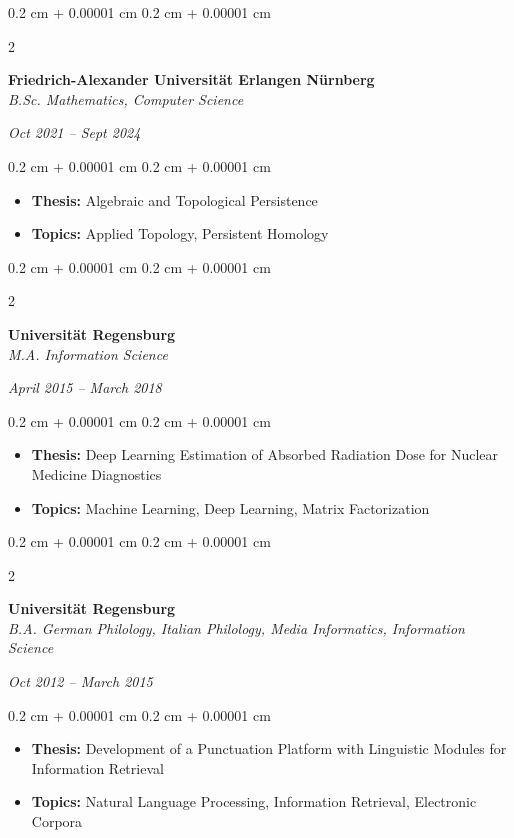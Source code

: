 \documentclass[10pt, letterpaper]{article}
\newenvironment{highlights}{
    \begin{itemize}[
        topsep=0.10 cm,
        parsep=0.10 cm,
        partopsep=0pt,
        itemsep=0pt,
        leftmargin=0.4 cm + 10pt
    ]
}{
    \end{itemize}
}
\newenvironment{onecolentry}{
    \begin{adjustwidth}{
        0.2 cm + 0.00001 cm
    }{
        0.2 cm + 0.00001 cm
    }
}{
    \end{adjustwidth}
}
\newenvironment{twocolentry}[2][]{
    \onecolentry
    \def\secondColumn{#2}
    \setcolumnwidth{\fill, 4.5 cm}
    \begin{paracol}{2}
}{
    \switchcolumn \raggedleft \secondColumn
    \end{paracol}
    \endonecolentry
}
\begin{document}
\vspace{0.10 cm}
\begin{twocolentry}{           
	\textit{Oct 2021 – Sept 2024}}
	\textbf{Friedrich-Alexander Universität Erlangen Nürnberg} \\
	\textit{B.Sc. Mathematics, Computer Science}
\end{twocolentry}
\vspace{0.10 cm}
\begin{onecolentry}
	\begin{highlights}
		\item \textbf{Thesis:} Algebraic and Topological Persistence
		\item \textbf{Topics:} Applied Topology, Persistent Homology
	\end{highlights}
\end{onecolentry}

\vspace{0.10 cm}
\begin{twocolentry}{           
	\textit{April 2015 – March 2018}}
	\textbf{Universität Regensburg} \\
	\textit{M.A. Information Science}
\end{twocolentry}
\vspace{0.10 cm}
\begin{onecolentry}
	\begin{highlights}
		\item \textbf{Thesis:} Deep Learning Estimation of Absorbed Radiation Dose for Nuclear Medicine Diagnostics
		\item \textbf{Topics:} Machine Learning, Deep Learning, Matrix Factorization
	\end{highlights}
\end{onecolentry}

\vspace{0.10 cm}
\begin{twocolentry}{           
	\textit{Oct 2012 – March 2015}}
	\textbf{Universität Regensburg} \\
	\textit{B.A. German Philology, Italian Philology, Media Informatics, Information Science}
\end{twocolentry}
\vspace{0.10 cm}
\begin{onecolentry}
	\begin{highlights}
		\item \textbf{Thesis:} Development of a Punctuation Platform with Linguistic Modules for Information Retrieval
		\item \textbf{Topics:} Natural Language Processing, Information Retrieval, Electronic Corpora
	\end{highlights}
\end{onecolentry}
\end{document}

